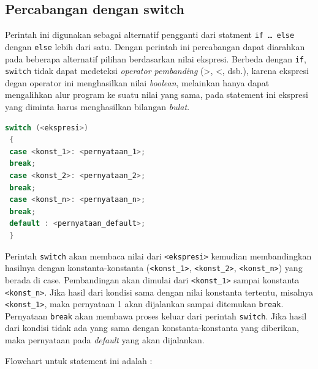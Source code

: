 \subsection{Percabangan dengan switch}\label{percabangan-dengan-switch}

Perintah ini digunakan sebagai alternatif pengganti dari statment
\texttt{if\ \ldots{}\ else} dengan \texttt{else} lebih dari satu. Dengan
perintah ini percabangan dapat diarahkan pada beberapa alternatif
pilihan berdasarkan nilai ekspresi. Berbeda dengan \texttt{if},
\texttt{switch} tidak dapat medeteksi \emph{operator pembanding}
(\textgreater{}, \textless{}, dsb.), karena ekspresi degan operator ini
menghasilkan nilai \emph{boolean}, melainkan hanya dapat mengalihkan
alur program ke suatu nilai yang sama, pada statement ini ekspresi yang
diminta harus menghasilkan bilangan \emph{bulat}.

\begin{lstlisting}[language=c++, numbers=none]
 switch (<ekspresi>)
 {
 case <konst_1>: <pernyataan_1>;
 break;
 case <konst_2>: <pernyataan_2>;
 break;
 case <konst_n>: <pernyataan_n>;
 break;
 default : <pernyataan_default>;
 }
\end{lstlisting}

Perintah \texttt{switch} akan membaca nilai dari
\texttt{\textless{}ekspresi\textgreater{}} kemudian membandingkan
hasilnya dengan konstanta-konstanta
(\texttt{\textless{}konst\_1\textgreater{}},
\texttt{\textless{}konst\_2\textgreater{}},
\texttt{\textless{}konst\_n\textgreater{}}) yang berada di case.
Pembandingan akan dimulai dari
\texttt{\textless{}konst\_1\textgreater{}} sampai konstanta
\texttt{\textless{}konst\_n\textgreater{}}. Jika hasil dari kondisi sama
dengan nilai konstanta tertentu, misalnya
\texttt{\textless{}konst\_1\textgreater{}}, maka pernyataan 1 akan
dijalankan sampai ditemukan \texttt{break}. Pernyataan \texttt{break}
akan membawa proses keluar dari perintah \texttt{switch}. Jika hasil
dari kondisi tidak ada yang sama dengan konstanta-konstanta yang
diberikan, maka pernyataan pada \emph{default} yang akan dijalankan.

Flowchart untuk statement ini adalah :

